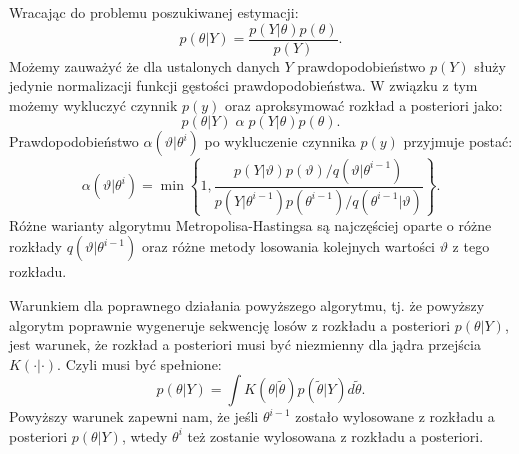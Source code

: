 Wracając do problemu poszukiwanej estymacji:
\begin{equation}
    p(\theta|Y) = \frac{p(Y|\theta)p(\theta)}{p(Y)}.
\end{equation}
Możemy zauważyć że dla ustalonych danych $Y$ prawdopodobieństwo $p(Y)$ służy jedynie normalizacji funkcji gęstości prawdopodobieństwa. W związku z tym możemy wykluczyć czynnik $p(y)$ oraz aproksymować rozkład a posteriori jako:
\begin{equation}
    p(\theta|Y)\;\alpha\;p(Y|\theta)p(\theta).
\end{equation}
Prawdopodobieństwo $\alpha(\vartheta | \theta^i)$ po wykluczenie czynnika $p(y)$ przyjmuje postać:
\begin{equation}
    \alpha(\vartheta|\theta^i) = \min \left\{ 1, \frac{p(Y|\vartheta)p(\vartheta)/q(\vartheta|\theta^{i-1})}{p(Y|\theta^{i-1})p(\theta^{i-1})/q(\theta^{i-1}|\vartheta)}\right\}.
\end{equation}
Różne warianty algorytmu Metropolisa-Hastingsa są najczęściej oparte o różne rozkłady $q(\vartheta|\theta^{i-1})$ oraz różne metody losowania kolejnych wartości $\vartheta$ z tego rozkładu. 

Warunkiem dla poprawnego działania powyższego algorytmu, tj. że powyższy algorytm poprawnie wygeneruje sekwencję losów z rozkładu a posteriori $p(\theta|Y)$, jest warunek, że rozkład a posteriori musi być niezmienny dla jądra przejścia $K(\cdot|\cdot)$. Czyli musi być spełnione:
\begin{equation}
    \label{eqn:transitionKernelToProof}
    p(\theta|Y) = \int K(\theta|\widetilde{\theta})p(\widetilde{\theta}|Y)d\widetilde{\theta}.
\end{equation}
Powyższy warunek zapewni nam, że jeśli $\theta^{i-1}$ zostało wylosowane z rozkładu a posteriori $p(\theta|Y)$, wtedy $\theta^{i}$ też zostanie wylosowana z rozkładu a posteriori.

